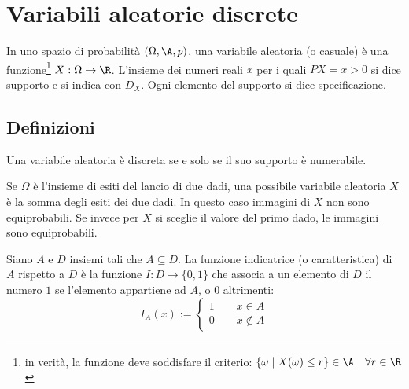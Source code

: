 %
%
%
%


\section{Variabili aleatorie discrete}
\begin{defin}
	In uno spazio di probabilità $(\Omega, \A, p)$, una variabile aleatoria (o casuale) è una funzione\footnote{in verità, la funzione deve soddisfare il criterio: $\{\omega \mid X(\omega)\leq r\}\in\A\quad\forall r\in\R$} $X:\Omega \to \R$.
	L'insieme dei numeri reali $x$ per i quali $P{X=x}>0$ si dice supporto e si indica con $D_X$. Ogni elemento del supporto si dice specificazione.
\end{defin}


\subsection{Definizioni}
\begin{defin}
	Una variabile aleatoria è discreta se e solo se il suo supporto è numerabile.
\end{defin}

\begin{examp}
	Se $\Omega$ è l'insieme di esiti del lancio di due dadi, una possibile variabile aleatoria $X$ è la somma degli esiti dei due dadi. In questo caso immagini di $X$ non sono equiprobabili. Se invece per $X$ si sceglie il valore del primo dado, le immagini sono equiprobabili.
\end{examp}

\begin{defin}
	Siano $A$ e $D$ insiemi tali che $A\subseteq D$. La funzione indicatrice (o caratteristica) di $A$ rispetto a $D$ è la funzione $I:D\to \{0,1\}$ che associa a un elemento di $D$ il numero $1$ se l'elemento appartiene ad $A$, o $0$ altrimenti:
	\begin{equation*}
		I_A(x) := \begin{cases}
			1 \qquad x\in A \\
			0 \qquad x\notin A
		\end{cases}
	\end{equation*}
\end{defin}

